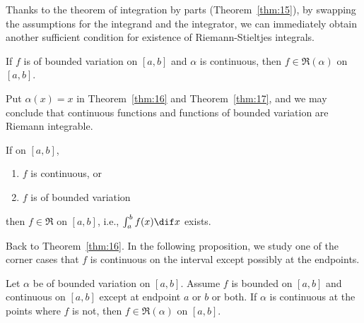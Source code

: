 \documentclass[thmcnt=section, color=blue, 12pt]{my-elegantbook}
\begin{document}
Thanks to the theorem of integration by parts (Theorem~\ref{thm:15}),
by swapping the assumptions for the integrand and the integrator,
we can immediately obtain another sufficient condition for
existence of Riemann-Stieltjes integrals.

\begin{theorem} \label{thm:17}
	If $f$ is of bounded variation on $[a, b]$ and $\alpha$ is continuous,
	then $f \in \mathfrak{R}(\alpha)$ on $[a, b]$.
\end{theorem}

Put $\alpha(x) = x$ in Theorem~\ref{thm:16} and Theorem~\ref{thm:17},
and we may conclude that continuous functions and functions of bounded variation
are Riemann integrable.

\begin{theorem}
	If on $[a, b]$,
	\begin{enumerate}
		\item $f$ is continuous, or
		\item $f$ is of bounded variation
	\end{enumerate}
	then $f \in \mathfrak{R}$ on $[a, b]$, i.e., $\int_a^b f(x) \dif x$ exists.
\end{theorem}


Back to Theorem~\ref{thm:16}.
In the following proposition, we study one of the corner cases
that $f$ is continuous on the interval except possibly
at the endpoints.

\begin{proposition}
	Let $\alpha$ be of bounded variation on $[a, b]$.
	Assume $f$ is bounded on $[a, b]$ and
	continuous on $[a, b]$ except at endpoint $a$ or $b$ or both.
	If $\alpha$ is continuous at the points where $f$ is not,
	then $f \in \mathfrak{R}(\alpha)$ on $[a, b]$.
\end{proposition}
\end{document}
